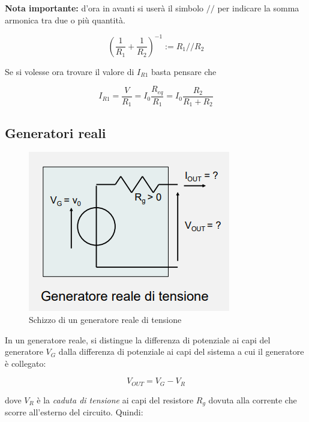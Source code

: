 \documentclass{article}
\begin{document}
\vspace{3mm}

\textbf{Nota importante:} d'ora in avanti si userà il simbolo $//$ per indicare la somma armonica tra due o più quantità.

\[\displaystyle{\left(\frac{1}{R_1}+\frac{1}{R_2}\right)^{-1}:= R_1//R_2}\]

\vspace{3mm}

Se si volesse ora trovare il valore di $I_{R1}$ basta pensare che

\[I_{R1} = \frac{V}{R_1} = I_0 \frac{R_{eq}}{R_1} = I_0 \frac{R_2}{R_1 + R_2}\]

\clearpage










\subsection{Generatori reali}

\begin{figure}[h]
  \centering
  \includegraphics[scale=0.5]{IM_generatori_reali_tensione}
  \caption{Schizzo di un generatore reale di tensione}
  \label{Schema_generatore_reale_tensione}
\end{figure}

In un generatore reale, si distingue la differenza di potenziale ai capi del generatore $V_G$ dalla differenza di potenziale ai capi del sistema a cui il generatore è collegato:

\[V_{OUT} = V_G - V_R\]

dove $V_R$ è la \textit{caduta di tensione} ai capi del resistore $R_g$ dovuta alla corrente che scorre all'esterno del circuito. Quindi:
\end{document}
